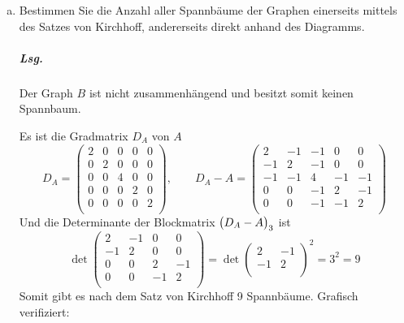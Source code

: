 \documentclass{scrreprt}
\begin{document}
\begin{enumerate}[(a)]
\begin{minipage}{.5\textwidth}
  \end{minipage}

\item Bestimmen Sie die Anzahl aller Spannbäume der Graphen einerseits mittels
  des Satzes von Kirchhoff, andererseits direkt anhand des Diagramms.

  \subparagraph{Lsg.} Der Graph $B$ ist nicht zusammenhängend und besitzt somit
  keinen Spannbaum.

  Es ist die Gradmatrix $D_A$ von $A$
  \[
    D_A = \begin{pmatrix}
      2 & 0 & 0 & 0 & 0 \\
      0 & 2 & 0 & 0 & 0 \\
      0 & 0 & 4 & 0 & 0 \\
      0 & 0 & 0 & 2 & 0 \\
      0 & 0 & 0 & 0 & 2 \\
    \end{pmatrix}, \qquad D_A - A = \begin{pmatrix}
      2  & -1 & -1 & 0  & 0  \\
      -1 & 2  & -1 & 0  & 0  \\
      -1 & -1 & 4  & -1 & -1 \\
      0  & 0  & -1 & 2  & -1 \\
      0  & 0  & -1 & -1 & 2  \\
    \end{pmatrix}
  \]
  Und die Determinante der Blockmatrix $\qty\big(D_A - A)_3$ ist
  \[
    \det\begin{pmatrix}
      2  & -1 & 0  & 0  \\
      -1 & 2  & 0  & 0  \\
      0  & 0  & 2  & -1 \\
      0  & 0  & -1 & 2  \\
    \end{pmatrix} = \det\begin{pmatrix}
      2  & -1 \\
      -1 & 2  \\
    \end{pmatrix}^2 = 3^2 = 9
  \]
  Somit gibt es nach dem Satz von Kirchhoff 9 Spannbäume.
  Grafisch verifiziert:

  \begin{minipage}{.3\textwidth}
\end{minipage}
\end{enumerate}
\end{document}
